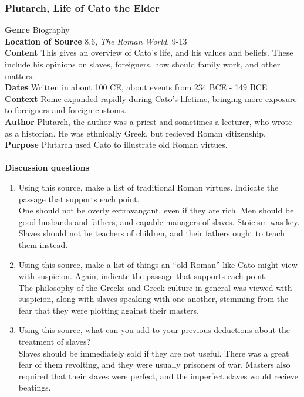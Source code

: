 \documentclass{article}
\begin{document}
\subsubsection*{Plutarch, Life of Cato the Elder}
\textbf{Genre}
Biography \\
\textbf{Location of Source}
8.6, \textit{The Roman World}, 9-13 \\
\textbf{Content}
This gives an overview of Cato's life, and his values and beliefs. These include his opinions
on slaves, foreigners, how should family work, and other matters.\\
\textbf{Dates}
Written in about 100 CE, about events from 234 BCE - 149 BCE \\
\textbf{Context}
Rome expanded rapidly during Cato’s lifetime, bringing more exposure to foreigners and
foreign customs. \\
\textbf{Author}
Plutarch, the author was a priest and sometimes a lecturer, who wrote as a historian. He was
ethnically Greek, but recieved Roman citizenship. \\
\textbf{Purpose}
Plutarch used Cato to illustrate old Roman virtues. \\
\\
\textbf{Discussion questions}
\begin{enumerate}
  \item Using this source, make a list of traditional Roman virtues. Indicate the passage
  that supports each point. \\
  One should not be overly extravangant, even if they are rich. Men should be good husbands
  and fathers, and capable managers of slaves. Stoicism was key. Slaves should not be teachers
  of children, and their fathers ought to teach them instead.
  \item Using this source, make a list of things an “old Roman” like Cato might view with
  suspicion. Again, indicate the passage that supports each point. \\
  The philosophy of the Greeks and Greek culture in general was viewed with suspicion, along
  with slaves speaking with one another, stemming from the fear that they were plotting against
  their masters.
  \item Using this source, what can you add to your previous deductions about the treatment
  of slaves? \\
  Slaves should be immediately sold if they are not useful. There was a great fear of them
  revolting, and they were usually prisoners of war. Masters also required that  their slaves
  were perfect, and the imperfect slaves would recieve beatings.
\end{enumerate}
\end{document}
